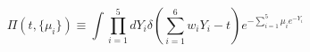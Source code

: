 \begin{equation}
\label{PF1}
\Pi(t,\{\mu_i\})
\equiv\int\prod_{i=1}^5dY_i\delta(\sum_{i=1}^6w_iY_i-t)e^{-\sum_{i=1}^5\mu_ie^{-Y_i}}
\end{equation}

